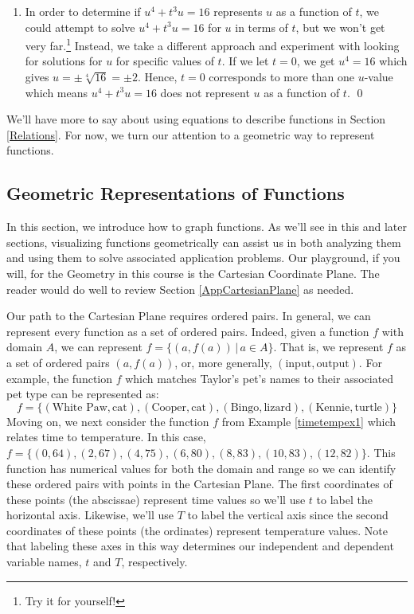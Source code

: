\documentclass{ximera}
\begin{document}
\begin{example}
\begin{enumerate}
\begin{enumerate}
\item  In order to determine if  $u^{4} + t^{3}u = 16$ represents $u$ as a function of $t$, we could attempt to solve $u^{4} + t^{3}u = 16$ for $u$ in terms of $t$, but we won't get very far.\footnote{Try it for yourself!}  Instead, we take a different approach and experiment with looking for solutions for $u$ for specific values of $t$.  If we let $t = 0$, we get $u^{4} = 16$ which gives $u = \pm \sqrt[4]{16} = \pm 2$.  Hence, $t = 0$ corresponds to more than one $u$-value which means  $u^{4}  +t^{3}u = 16$  does not represent $u$ as a function of $t$.  \qed

\end{enumerate}

\end{enumerate}

\end{example}

We'll have more to say about using equations to describe functions in Section \ref{Relations}.  For now, we turn our attention to a geometric way to represent functions.

\subsection{Geometric Representations of Functions}
\label{geometricrepresentationssection}

In this section, we introduce how to graph functions.  As we'll see in this and later sections, visualizing functions geometrically can assist us in both analyzing them and using them to solve associated application problems.  Our playground, if you will, for the Geometry in this course is the Cartesian Coordinate Plane.  The reader would do well to review Section \ref{AppCartesianPlane} as needed.

\medskip

Our path to the Cartesian Plane requires ordered pairs.  In general, we can represent every function as a set of ordered pairs.  Indeed, given a function $f$ with domain $A$, we can represent $f = \{ (a, f(a)) \, | \, a \in A\}$.  That is, we represent $f$ as a set of ordered pairs $(a, f(a))$, or, more generally, $(\text{input}, \text{output})$.  For example, the function $f$ which matches Taylor's pet's names to their associated pet type can be represented as: \[ f = \{ (\text{White Paw}, \text{cat}), (\text{Cooper}, \text{cat}), (\text{Bingo}, \text{lizard}), (\text{Kennie}, \text{turtle}) \} \] Moving on, we next  consider the function $f$ from Example \ref{timetempex1} which relates time to temperature. In this case,  $f = \{ (0, 64), (2, 67), (4, 75), (6, 80), (8, 83), (10, 83), (12, 82) \}$.   This function has numerical values for both the domain and range so we can identify these ordered pairs with points in the Cartesian Plane.  The first coordinates of these points (the abscissae) represent time values so we'll use $t$ to label the horizontal axis.  Likewise, we'll use $T$ to label the vertical axis since the second coordinates of these points (the ordinates) represent temperature values.  Note that labeling these axes in this way determines our independent and dependent variable names, $t$ and $T$, respectively.
\end{document}

